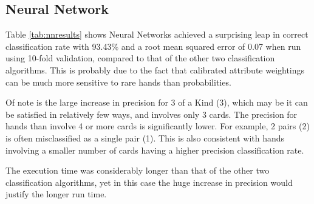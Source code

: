 \documentclass[11pt, a4paper]{article}
\begin{document}
\subsection*{Neural Network}

Table \ref{tab:nnresults} shows Neural Networks achieved a surprising leap in correct classification rate with 93.43\% and a root mean squared error of 0.07 when run using 10-fold validation, compared to that of the other two classification algorithms. This is probably due to the fact that calibrated attribute weightings can be much more sensitive to rare hands than probabilities.

Of note is the large increase in precision for 3 of a Kind (3), which may be it can be satisfied in relatively few ways, and involves only 3 cards. The precision for hands than involve 4 or more cards is significantly lower. For example, 2 pairs (2) is often misclassified as a single pair (1). This is also consistent with hands involving a smaller number of cards having a higher precision classification rate. 

The execution time was considerably longer than that of the other two classification algorithms, yet in this case the huge increase in precision would justify the longer run time.
                 
\end{document}
